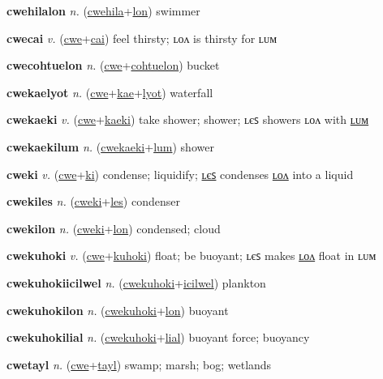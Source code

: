 \textbf{\hypertarget{cwehilalon}{cwehilalon}} \textit{n.} (\hyperlink{cwehila}{cwehila}+\allowbreak \hyperlink{lon}{lon})
swimmer

\textbf{\hypertarget{cwecai}{cwecai}} \textit{v.} (\hyperlink{cwe}{cwe}+\allowbreak \hyperlink{cai}{cai})
feel thirsty; ʟᴏᴧ is thirsty for ʟᴜᴍ

\textbf{\hypertarget{cwecohtuelon}{cwecohtuelon}} \textit{n.} (\hyperlink{cwe}{cwe}+\allowbreak \hyperlink{cohtuelon}{cohtuelon})
bucket

\textbf{\hypertarget{cwekaelyot}{cwekaelyot}} \textit{n.} (\hyperlink{cwe}{cwe}+\allowbreak \hyperlink{kae}{kae}+\allowbreak \hyperlink{lyot}{lyot})
waterfall

\textbf{\hypertarget{cwekaeki}{cwekaeki}} \textit{v.} (\hyperlink{cwe}{cwe}+\allowbreak \hyperlink{kaeki}{kaeki})
take shower; shower; ʟєꜱ showers ʟᴏᴧ with \hyperlink{cwekaekilum}{ʟᴜᴍ}

\textbf{\hypertarget{cwekaekilum}{cwekaekilum}} \textit{n.} (\hyperlink{cwekaeki}{cwekaeki}+\allowbreak \hyperlink{lum}{lum})
shower

\textbf{\hypertarget{cweki}{cweki}} \textit{v.} (\hyperlink{cwe}{cwe}+\allowbreak \hyperlink{ki}{ki})
condense; liquidify; \hyperlink{cwekiles}{ʟєꜱ} condenses \hyperlink{cwekilon}{ʟᴏᴧ} into a liquid

\textbf{\hypertarget{cwekiles}{cwekiles}} \textit{n.} (\hyperlink{cweki}{cweki}+\allowbreak \hyperlink{les}{les})
condenser

\textbf{\hypertarget{cwekilon}{cwekilon}} \textit{n.} (\hyperlink{cweki}{cweki}+\allowbreak \hyperlink{lon}{lon})
condensed; cloud

\textbf{\hypertarget{cwekuhoki}{cwekuhoki}} \textit{v.} (\hyperlink{cwe}{cwe}+\allowbreak \hyperlink{kuhoki}{kuhoki})
float; be buoyant; ʟєꜱ makes \hyperlink{cwekuhokilon}{ʟᴏᴧ} float in ʟᴜᴍ

\textbf{\hypertarget{cwekuhokiicilwel}{cwekuhokiicilwel}} \textit{n.} (\hyperlink{cwekuhoki}{cwekuhoki}+\allowbreak \hyperlink{icilwel}{icilwel})
plankton

\textbf{\hypertarget{cwekuhokilon}{cwekuhokilon}} \textit{n.} (\hyperlink{cwekuhoki}{cwekuhoki}+\allowbreak \hyperlink{lon}{lon})
buoyant

\textbf{\hypertarget{cwekuhokilial}{cwekuhokilial}} \textit{n.} (\hyperlink{cwekuhoki}{cwekuhoki}+\allowbreak \hyperlink{lial}{lial})
buoyant force; buoyancy

\textbf{\hypertarget{cwetayl}{cwetayl}} \textit{n.} (\hyperlink{cwe}{cwe}+\allowbreak \hyperlink{tayl}{tayl})
swamp; marsh; bog; wetlands


